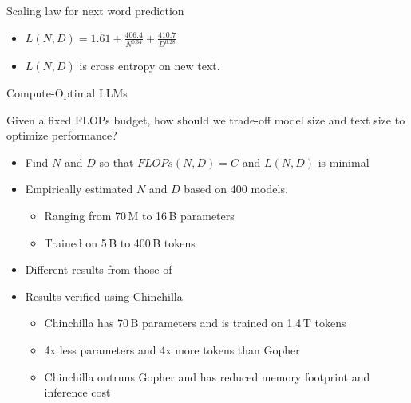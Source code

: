\begin{vbframe}{Scaling law for next word prediction}

\vfill

\begin{itemize}


\item $L(N,D) = 1.61 + \frac{406.4}{N^{0.34}}        + \frac{410.7}{D^{0.28}}$        

\item $L(N,D)$ is cross entropy on new text.
        
	\end{itemize}


\vskip3mm


\vfill

\end{vbframe}


\begin{vbframe}{Compute-Optimal LLM\MakeLowercase{s}}

Given a fixed FLOPs budget, how should we trade-off model size and text size to optimize performance? 

\vfill

\begin{itemize}

	\item Find $N$ and $D$ so that $FLOPs(N,D) = C$ and $L(N,D)$ is minimal

	\item Empirically estimated $N$ and $D$ based on 400 models. 
	\begin{itemize}
	\item Ranging from 70\,M to 16\,B parameters
	\item Trained on 5\,B to 400\,B tokens
	\end{itemize}

	\item Different results from those of  
	\item Results verified using Chinchilla
	\begin{itemize}
	\item Chinchilla has 70\,B parameters and is trained on 1.4\,T tokens
	\item 4x less parameters and 4x more tokens than Gopher
	\item Chinchilla outruns Gopher and has reduced memory footprint and inference cost 
	\end{itemize}

\end{itemize}

\vfill

\end{vbframe}

